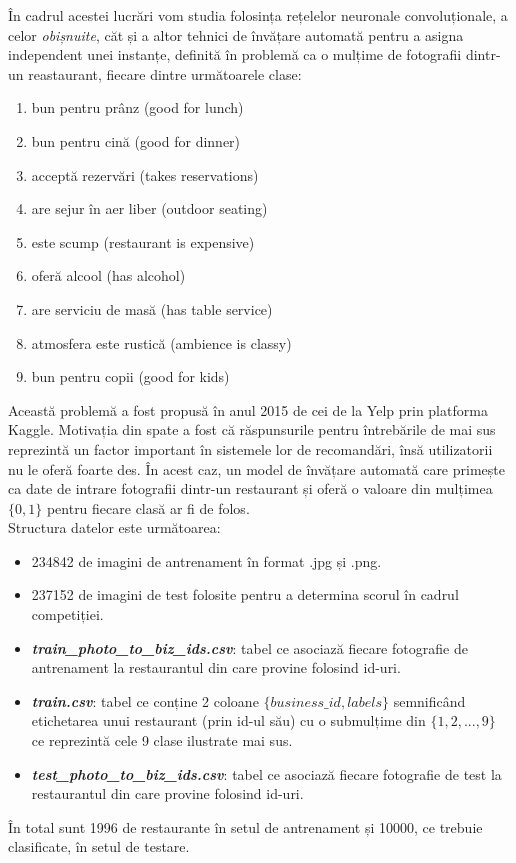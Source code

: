 În cadrul acestei lucrări vom studia folosința rețelelor neuronale convoluționale, a celor \textit{obișnuite}, căt și a altor tehnici de învățare automată pentru a asigna independent unei instanțe, definită în problemă ca o mulțime de fotografii dintr-un reastaurant, fiecare dintre următoarele clase:\\

\begin{enumerate}
\item bun pentru prânz (good for lunch)
\item bun pentru cină (good for dinner)
\item acceptă rezervări (takes reservations)
\item are sejur în aer liber (outdoor seating)
\item este scump (restaurant is expensive)
\item oferă alcool (has alcohol)
\item are serviciu de masă (has table service)
\item atmosfera este rustică (ambience is classy)
\item bun pentru copii (good for kids)
\end{enumerate}

Această problemă a fost propusă în anul 2015 de cei de la Yelp prin platforma Kaggle.\cite{competition} Motivația din spate a fost că răspunsurile pentru întrebările de mai sus reprezintă un factor important în sistemele lor de recomandări, însă utilizatorii nu le oferă foarte des. În acest caz, un model de învățare automată care primește ca date de intrare fotografii dintr-un restaurant și oferă o valoare din mulțimea $\{0, 1\}$ pentru fiecare clasă ar fi de folos.\\

Structura datelor este următoarea:

\begin{itemize}
\item 234842 de imagini de antrenament în format .jpg și .png.
\item 237152 de imagini de test folosite pentru a determina scorul în cadrul competiției.
\item \textit{\textbf{train\_photo\_to\_biz\_ids.csv}}: tabel ce asociază fiecare fotografie de antrenament la restaurantul din care provine folosind id-uri.
\item \textit{\textbf{train.csv}}: tabel ce conține 2 coloane $\{business\_id, labels\}$ semnificând etichetarea unui restaurant (prin id-ul său) cu o submulțime din $\{1,2,...,9\}$ ce reprezintă cele 9 clase ilustrate mai sus.
\item \textit{\textbf{test\_photo\_to\_biz\_ids.csv}}: tabel ce asociază fiecare fotografie de test la restaurantul din care provine folosind id-uri.
\end{itemize}

În total sunt 1996 de restaurante în setul de antrenament și 10000, ce trebuie clasificate, în setul de testare.
